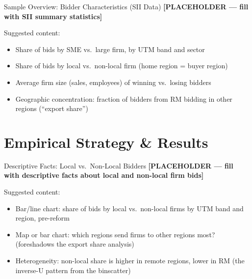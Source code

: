 \documentclass[9pt,aspectratio=169]{beamer}
\begin{document}
\begin{frame}{Sample Overview: Bidder Characteristics (SII Data)}
\textbf{[PLACEHOLDER — fill with SII summary statistics]}

\medskip
Suggested content:
\begin{itemize}
  \item Share of bids by SME vs.\ large firm, by UTM band and sector
  \item Share of bids by local vs.\ non-local firm (home region = buyer region)
  \item Average firm size (sales, employees) of winning vs.\ losing bidders
  \item Geographic concentration: fraction of bidders from RM bidding in
        other regions (``export share'')
\end{itemize}
\end{frame}


\section{Empirical Strategy \& Results}

\begin{frame}{Descriptive Facts: Local vs.\ Non-Local Bidders}
\textbf{[PLACEHOLDER --- fill with descriptive facts about local and non-local firm bids]}

\medskip
Suggested content:
\begin{itemize}
  \item Bar/line chart: share of bids by local vs.\ non-local firms by
        UTM band and region, pre-reform
  \item Map or bar chart: which regions send firms to other regions most?
        (foreshadows the export share analysis)
  \item Heterogeneity: non-local share is higher in remote regions,
        lower in RM (the inverse-U pattern from the binscatter)
\end{itemize}
\end{frame}
\end{document}
